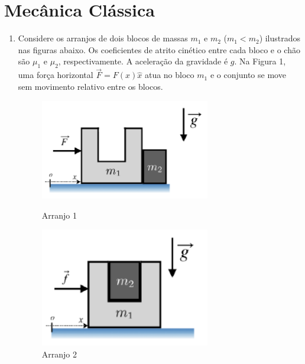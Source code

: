 %
%
\chapter{Mecânica Clássica}

\begin{enumerate}[start=1,label={\bfseries Q\arabic*.}]


\item Considere os arranjos de dois blocos de massas $m_{1}$ e $m_{2}$ ($m_{1} < m_{2}$) ilustrados nas figuras abaixo. Os coeficientes de atrito cinético entre cada bloco e o chão são $\mu_{1}$ e $\mu_{2}$, respectivamente. A aceleração da gravidade é $g$. Na Figura 1, uma força horizontal $\vec{F} = F(x)\hat{x}$ atua no bloco $m_{1}$ e o conjunto se move sem movimento relativo entre os blocos.


\begin{figure}[!ht]
	\centering
	\begin{minipage}{0.5\textwidth}
		\centering
		\includegraphics[width=0.7\textwidth]{classica-img/bloco1a.png} 
		\caption{Arranjo 1}
		\label{fig:bloco1apng}
	\end{minipage}\hfill
	\begin{minipage}{0.5\textwidth}
		\centering
		\includegraphics[width=0.7\textwidth]{classica-img/bloco2a.png}
		\caption{Arranjo 2}
		\label{fig:bloco2apng}
	\end{minipage}
\end{figure}


\end{enumerate}
